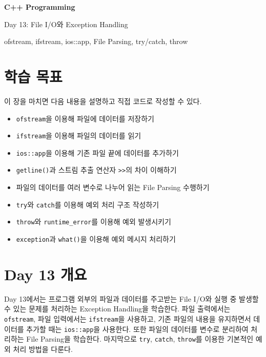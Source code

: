 \documentclass[11pt,a4paper]{article}
\begin{document}
\begin{titlepage}
    \centering
    \vspace*{3cm}
    {\Huge\bfseries C++ Programming\par}
    \vspace{0.8cm}
    {\LARGE Day 13: File I/O와 Exception Handling\par}
    \vspace{2cm}
    {\large ofstream, ifstream, ios::app, File Parsing, try/catch, throw\par}
    \vfill
\end{titlepage}

\tableofcontents
\newpage

\section{학습 목표}
\begin{learningbox}
이 장을 마치면 다음 내용을 설명하고 직접 코드로 작성할 수 있다.
\begin{itemize}[leftmargin=1.5em]
    \item \texttt{ofstream}을 이용해 파일에 데이터를 저장하기
    \item \texttt{ifstream}을 이용해 파일의 데이터를 읽기
    \item \texttt{ios::app}을 이용해 기존 파일 끝에 데이터를 추가하기
    \item \texttt{getline()}과 스트림 추출 연산자 \texttt{>>}의 차이 이해하기
    \item 파일의 데이터를 여러 변수로 나누어 읽는 File Parsing 수행하기
    \item \texttt{try}와 \texttt{catch}를 이용해 예외 처리 구조 작성하기
    \item \texttt{throw}와 \texttt{runtime\_error}를 이용해 예외 발생시키기
    \item \texttt{exception}과 \texttt{what()}을 이용해 예외 메시지 처리하기
\end{itemize}
\end{learningbox}

\section{Day 13 개요}
Day 13에서는 프로그램 외부의 파일과 데이터를 주고받는 File I/O와 실행 중 발생할 수 있는 문제를 처리하는 Exception Handling을 학습한다.
파일 출력에서는 \texttt{ofstream}, 파일 입력에서는 \texttt{ifstream}을 사용하고,
기존 파일의 내용을 유지하면서 데이터를 추가할 때는 \texttt{ios::app}을 사용한다.
또한 파일의 데이터를 변수로 분리하여 처리하는 File Parsing을 학습한다.
마지막으로 \texttt{try}, \texttt{catch}, \texttt{throw}를 이용한 기본적인 예외 처리 방법을 다룬다.
\end{document}
